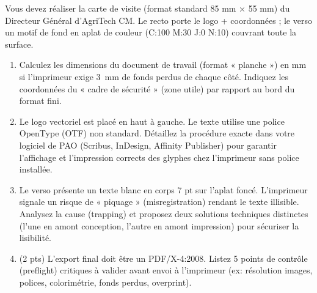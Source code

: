 \documentclass[11pt]{article}
\begin{document}
\begin{exercice}
Vous devez réaliser la carte de visite (format standard 85 mm × 55 mm) du Directeur Général d'AgriTech CM. Le recto porte le logo + coordonnées ; le verso un motif de fond en aplat de couleur (C:100 M:30 J:0 N:10) couvrant toute la surface.

\begin{enumerate}
    \item Calculez les dimensions du document de travail (format « planche ») en mm si l'imprimeur exige \SI{3}{mm} de fonds perdus de chaque côté. Indiquez les coordonnées du « cadre de sécurité » (zone utile) par rapport au bord du format fini.
    \item Le logo vectoriel est placé en haut à gauche. Le texte utilise une police OpenType (OTF) non standard. Détaillez la procédure exacte dans votre logiciel de PAO (Scribus, InDesign, Affinity Publisher) pour garantir l'affichage et l'impression corrects des glyphes chez l'imprimeur sans police installée.
    \item Le verso présente un texte blanc en corps 7 pt sur l'aplat foncé. L'imprimeur signale un risque de « piquage » (misregistration) rendant le texte illisible. Analysez la cause (trapping) et proposez deux solutions techniques distinctes (l'une en amont conception, l'autre en amont impression) pour sécuriser la lisibilité.
    \item (2 pts) L'export final doit être un PDF/X-4:2008. Listez 5 points de contrôle (preflight) critiques à valider avant envoi à l'imprimeur (ex: résolution images, polices, colorimétrie, fonds perdus, overprint).
\end{enumerate}
\end{exercice}
\end{document}
